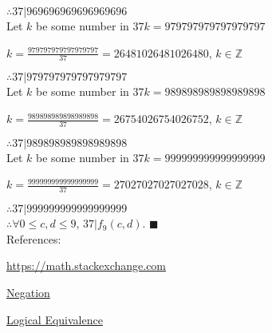 \documentclass{article}
\begin{document}
$ \therefore  37|969696969696969696 $ \\

Let $k$ be some number in $37k = 979797979797979797$

$k = \frac{979797979797979797}{37} = 26481026481026480$, $k \in \mathbb{Z}$

$ \therefore  37|979797979797979797 $ \\

Let $k$ be some number in $37k = 989898989898989898$

$k = \frac{989898989898989898}{37} = 26754026754026752$, $k \in \mathbb{Z}$

$ \therefore  37|989898989898989898 $ \\

Let $k$ be some number in $37k = 999999999999999999$

$k = \frac{999999999999999999}{37} = 27027027027027028$, $k \in \mathbb{Z}$

$ \therefore  37|999999999999999999 $ \\

$ \therefore \forall 0 \leq c,d \leq 9$, $37|f_9(c,d)$. $\blacksquare$ \\

References:

\href{https://math.stackexchange.com/questions/304217/is-forall-x-exists-y-qx-y-the-same-as-exists-y-forall-x-qx-y}{https://math.stackexchange.com}

\href{https://www.math.toronto.edu/preparing-for-calculus/3_logic/we_3_negation.html}{Negation}

\href{https://www.csm.ornl.gov/~sheldon/ds/sec1.1.html}{Logical Equivalence}
\end{document}
